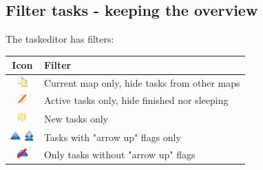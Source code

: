 \documentclass[12pt,a4paper]{article}
\begin{document}
\subsection{Filter tasks - keeping the overview}
The taskeditor has filters:  %
\begin{center}
    \begin{tabular}{|c|p{11cm}|} \hline
        {\bf Icon} &   {\bf Filter }   \\ \hline
        \includegraphics[width=0.4cm]{../icons/taskfilter-currentmap.png} &
             Current map only, hide tasks from other maps \\
        \includegraphics[width=0.4cm]{../icons/taskfilter-activetask.png} &
            Active tasks only, hide finished nor sleeping \\
        \includegraphics[width=0.5cm]{../icons/taskfilter-newtask.png} &
             New tasks only \\
        \includegraphics[width=0.4cm]{images/flags/arrow-up.png}
        \includegraphics[width=0.4cm]{images/flags/arrow2-up.png} &
            Tasks with "arrow up" flags only        \\
        \includegraphics[width=0.4cm]{../flags/system/no-arrow-up.png} &
            Only tasks without "arrow up" flags \\ \hline
    \end{tabular}
\end{center}
\end{document}
